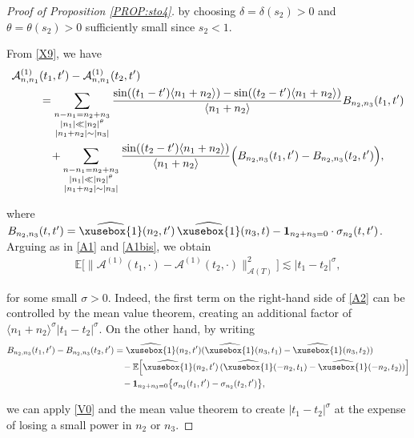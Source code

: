 \documentclass[%
11pt,  reqno]{amsart}
\def\<#1>{\xusebox{#1}}
\newcommand{\1}{\hspace{0.2mm}\text{I}\hspace{0.2mm}}
\newcommand{\noi}{\noindent}
\newcommand{\E}{\mathbb{E}}
\newcommand{\dl}{\delta}
\newcommand{\s}{\sigma}
\newcommand{\ft}{\widehat}
\newcommand{\ta}{\theta}
\newcommand{\les}{\lesssim}
\newcommand{\jb}[1]
{\langle #1 \rangle}
\newcommand{\ind}{\mathbf 1}
\newcommand{\A}{\mathcal{A}}
\numberwithin{equation}{section}
\numberwithin{theorem}{section}
\begin{document}
\begin{proof}[Proof of Proposition \ref{PROP:sto4}]
\noi
by choosing $\dl = \dl(s_2) > 0$ and $\theta = \ta(s_2)>0$
sufficiently small since $s_2<1$.


From \eqref{X9}, we have
\begin{align}
\begin{split}
\A^{(1)}_{n, n_1}
&  (t_1, t')
 - \A^{(1)}_{n, n_1} (t_2, t')\\
& =\sum_{\substack{n - n_1 =  n_2 + n_3\\ |n_1| \ll |n_2|^\theta \\ |n_1 + n_2|\sim |n_3|}}
 \frac{\sin ((t_1 - t') \jb{ n_1 + n_2 }) - \sin ((t_2 - t') \jb{ n_1 + n_2 })}{\jb{ n_1 + n_2 }} 
B_{n_2, n_3}(t_1, t')
 \\
& \hphantom{X}
+ \sum_{\substack{n - n_1 =  n_2 + n_3\\ |n_1| \ll |n_2|^\theta \\ |n_1 + n_2|\sim |n_3|}}
 \frac{\sin ((t_2 - t') \jb{ n_1 + n_2 })}{\jb{ n_1 + n_2 }} 
\Big( B_{n_2, n_3}(t_1, t') - B_{n_2, n_3}(t_2, t')\Big), 
\end{split}
\label{A2}
\end{align}

\noi
where $B_{n_2, n_3}(t, t') =  \ft{\<1>}(n_2, t') \, \ft{\<1>}(n_3, t) - \ind_{n_2 + n_3 = 0}\cdot \s_{n_2}(t, t')$.
Arguing as in \eqref{A1} and \eqref{A1bis}, we obtain
\begin{align*}
\E\big[\|\A^{(1)} (t_1, \cdot)-\A^{(1)} (t_2, \cdot)\|_{\A(T)}^2\big] \les |t_1-t_2|^{\s},
\end{align*}




\noi
for some small $\s>0$. 
Indeed, the first term on the right-hand side of \eqref{A2}
can be controlled by the mean value theorem, 
creating an additional factor of $\jb{n_1+n_2}^\s |t_1 - t_2|^\s$.
On the other hand, by writing
\begin{align*}
B_{n_2, n_3}(t_1, t')
- B_{n_2, n_3}(t_2, t')
&  =  \ft{\<1>}(n_2, t')  (\ft{\<1>}(n_3, t_1)- \ft{\<1>}(n_3, t_2))\\ 
 & \hphantom{X} 
- \E\Big[  \ft{\<1>}(n_2, t') \, (\ft{\<1>}(-n_2, t_1)- \ft{\<1>}(-n_2, t_2))\Big]\\
 & \hphantom{X} 
 - \ind_{n_2 + n_3 = 0}\big\{ \s_{n_2}(t_1, t') - \s_{n_2}(t_2, t')\big\}, 
\end{align*}

\noi
we can apply \eqref{V0} and the mean value theorem
to create $|t_1 - t_2|^\s$ at the expense of losing a small power
in $n_2$ or $n_3$.




\end{proof}
\end{document}
